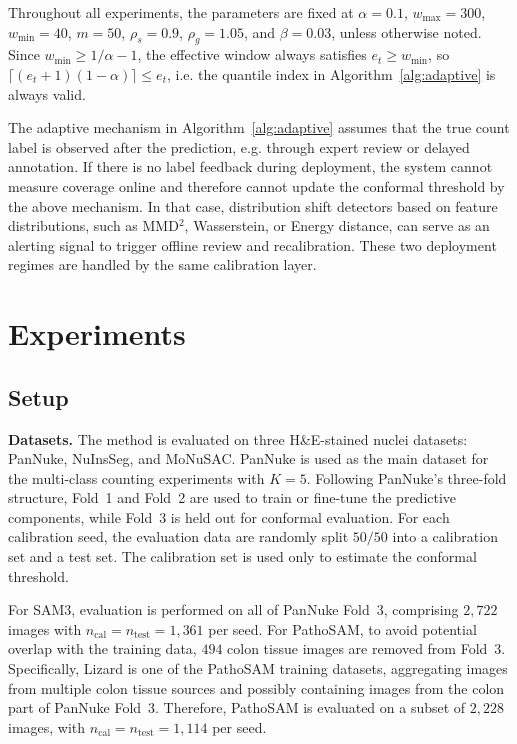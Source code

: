 \documentclass[smallextended,natbib]{svjour3}
\begin{document}
Throughout all experiments, the parameters are fixed at \(\alpha=0.1\),
\(w_{\max}=300\), \(w_{\min}=40\), \(m=50\), \(\rho_s=0.9\), \(\rho_g=1.05\), and
\(\beta=0.03\), unless otherwise noted. Since \(w_{\min}\ge 1/\alpha-1\), the
effective window always satisfies \(e_t\ge w_{\min}\), so
\(\lceil(e_t+1)(1-\alpha)\rceil\le e_t\), i.e. the quantile index in
Algorithm~\ref{alg:adaptive} is always valid.

The adaptive mechanism in Algorithm~\ref{alg:adaptive} assumes that the true count
label is observed after the prediction, e.g. through expert review or delayed
annotation. If there is no label feedback during deployment, the system cannot
measure coverage online and therefore cannot update the conformal threshold by the
above mechanism. In that case, distribution shift detectors based on feature
distributions, such as MMD\(^2\), Wasserstein, or Energy distance, can serve as an
alerting signal to trigger offline review and recalibration. These two deployment
regimes are handled by the same calibration layer.

\section{Experiments}\label{sec:exp}

\subsection{Setup}\label{sec:setup}

\textbf{Datasets.}
The method is evaluated on three H\&E-stained nuclei datasets: PanNuke, NuInsSeg,
and MoNuSAC. PanNuke is used as the main dataset for the multi-class counting
experiments with \(K=5\). Following PanNuke's three-fold structure, Fold~1 and
Fold~2 are used to train or fine-tune the predictive components, while Fold~3 is
held out for conformal evaluation. For each calibration seed, the evaluation data
are randomly split \(50/50\) into a calibration set and a test set. The calibration
set is used only to estimate the conformal threshold.

For SAM3, evaluation is performed on all of PanNuke Fold~3, comprising \(2{,}722\)
images with \(n_{\mathrm{cal}}=n_{\mathrm{test}}=1{,}361\) per seed. For PathoSAM,
to avoid potential overlap with the training data, \(494\) colon tissue images are
removed from Fold~3. Specifically, Lizard is one of the PathoSAM training datasets,
aggregating images from multiple colon tissue sources and possibly containing
images from the colon part of PanNuke Fold~3. Therefore, PathoSAM is evaluated on a
subset of \(2{,}228\) images, with
\(n_{\mathrm{cal}}=n_{\mathrm{test}}=1{,}114\) per seed.
\end{document}
